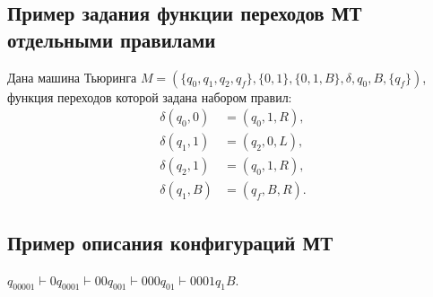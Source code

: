 \documentclass[12pt,a4paper]{article}
\begin{document}
\subsection*{Пример задания функции переходов МТ отдельными правилами}

Дана машина Тьюринга
$M=\left(\{q_0, q_1, q_2, q_f\},\{0,1\},\{0,1,B\},\delta,q_0,B,\{q_f\}\right)$,
функция переходов которой задана набором правил:
\begin{align*}
\delta(q_0,0)&=(q_0,1,R),\\
\delta(q_1,1)&=(q_2,0,L), \\
\delta(q_2,1)&=(q_0,1,R),\\
\delta(q_1,B)&=(q_f, B, R).
\end{align*}

\subsection*{Пример описания конфигураций МТ}

$q_00001 \vdash 0q_0001 \vdash 00q_001 \vdash 000q_01 \vdash 0001q_1B$.
\end{document}
